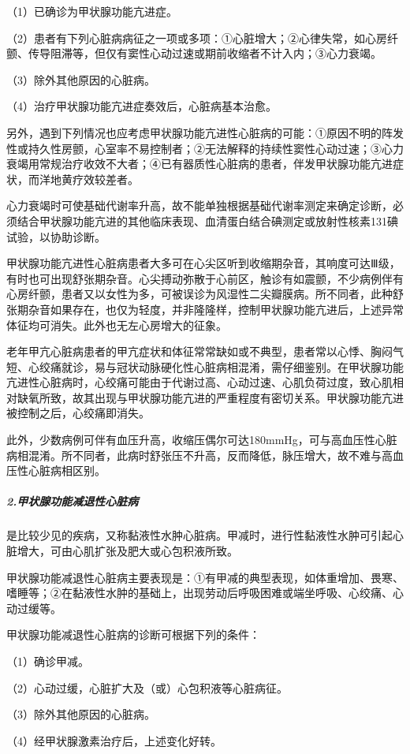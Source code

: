 （1）已确诊为甲状腺功能亢进症。

（2）患者有下列心脏病病征之一项或多项：①心脏增大；②心律失常，如心房纤颤、传导阻滞等，但仅有窦性心动过速或期前收缩者不计入内；③心力衰竭。

（3）除外其他原因的心脏病。

（4）治疗甲状腺功能亢进症奏效后，心脏病基本治愈。

另外，遇到下列情况也应考虑甲状腺功能亢进性心脏病的可能：①原因不明的阵发性或持久性房颤，心室率不易控制者；②无法解释的持续性窦性心动过速；③心力衰竭用常规治疗收效不大者；④已有器质性心脏病的患者，伴发甲状腺功能亢进症状，而洋地黄疗效较差者。

心力衰竭时可使基础代谢率升高，故不能单独根据基础代谢率测定来确定诊断，必须结合甲状腺功能亢进的其他临床表现、血清蛋白结合碘测定或放射性核素131碘试验，以协助诊断。

甲状腺功能亢进性心脏病患者大多可在心尖区听到收缩期杂音，其响度可达Ⅲ级，有时也可出现舒张期杂音。心尖搏动弥散于心前区，触诊有如震颤，不少病例伴有心房纤颤，患者又以女性为多，可被误诊为风湿性二尖瓣膜病。所不同者，此种舒张期杂音如果存在，也仅为轻度，并非隆隆样，控制甲状腺功能亢进后，上述异常体征均可消失。此外也无左心房增大的征象。

老年甲亢心脏病患者的甲亢症状和体征常常缺如或不典型，患者常以心悸、胸闷气短、心绞痛就诊，易与冠状动脉硬化性心脏病相混淆，需仔细鉴别。在甲状腺功能亢进性心脏病时，心绞痛可能由于代谢过高、心动过速、心肌负荷过度，致心肌相对缺氧所致，故其出现与甲状腺功能亢进的严重程度有密切关系。甲状腺功能亢进被控制之后，心绞痛即消失。

此外，少数病例可伴有血压升高，收缩压偶尔可达180mmHg，可与高血压性心脏病相混淆。所不同者，此病时舒张压不升高，反而降低，脉压增大，故不难与高血压性心脏病相区别。

\subparagraph{2.甲状腺功能减退性心脏病}

是比较少见的疾病，又称黏液性水肿心脏病。甲减时，进行性黏液性水肿可引起心脏增大，可由心肌扩张及肥大或心包积液所致。

甲状腺功能减退性心脏病主要表现是：①有甲减的典型表现，如体重增加、畏寒、嗜睡等；②在黏液性水肿的基础上，出现劳动后呼吸困难或端坐呼吸、心绞痛、心动过缓等。

甲状腺功能减退性心脏病的诊断可根据下列的条件：

（1）确诊甲减。

（2）心动过缓，心脏扩大及（或）心包积液等心脏病征。

（3）除外其他原因的心脏病。

（4）经甲状腺激素治疗后，上述变化好转。

